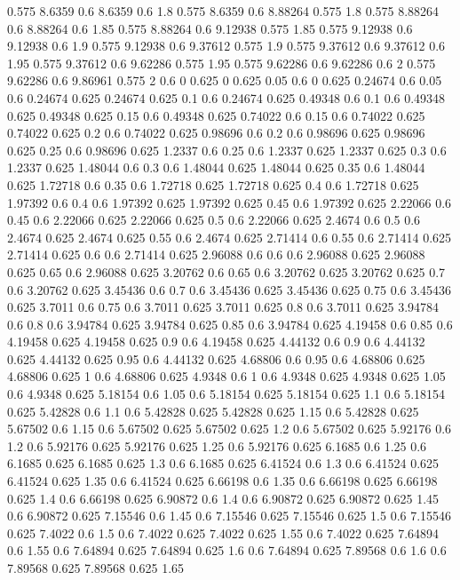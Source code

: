 0.575 8.6359
0.6 8.6359
0.6 1.8
0.575 8.6359
0.6 8.88264
0.575 1.8
0.575 8.88264
0.6 8.88264
0.6 1.85
0.575 8.88264
0.6 9.12938
0.575 1.85
0.575 9.12938
0.6 9.12938
0.6 1.9
0.575 9.12938
0.6 9.37612
0.575 1.9
0.575 9.37612
0.6 9.37612
0.6 1.95
0.575 9.37612
0.6 9.62286
0.575 1.95
0.575 9.62286
0.6 9.62286
0.6 2
0.575 9.62286
0.6 9.86961
0.575 2
0.6 0
0.625 0
0.625 0.05
0.6 0
0.625 0.24674
0.6 0.05
0.6 0.24674
0.625 0.24674
0.625 0.1
0.6 0.24674
0.625 0.49348
0.6 0.1
0.6 0.49348
0.625 0.49348
0.625 0.15
0.6 0.49348
0.625 0.74022
0.6 0.15
0.6 0.74022
0.625 0.74022
0.625 0.2
0.6 0.74022
0.625 0.98696
0.6 0.2
0.6 0.98696
0.625 0.98696
0.625 0.25
0.6 0.98696
0.625 1.2337
0.6 0.25
0.6 1.2337
0.625 1.2337
0.625 0.3
0.6 1.2337
0.625 1.48044
0.6 0.3
0.6 1.48044
0.625 1.48044
0.625 0.35
0.6 1.48044
0.625 1.72718
0.6 0.35
0.6 1.72718
0.625 1.72718
0.625 0.4
0.6 1.72718
0.625 1.97392
0.6 0.4
0.6 1.97392
0.625 1.97392
0.625 0.45
0.6 1.97392
0.625 2.22066
0.6 0.45
0.6 2.22066
0.625 2.22066
0.625 0.5
0.6 2.22066
0.625 2.4674
0.6 0.5
0.6 2.4674
0.625 2.4674
0.625 0.55
0.6 2.4674
0.625 2.71414
0.6 0.55
0.6 2.71414
0.625 2.71414
0.625 0.6
0.6 2.71414
0.625 2.96088
0.6 0.6
0.6 2.96088
0.625 2.96088
0.625 0.65
0.6 2.96088
0.625 3.20762
0.6 0.65
0.6 3.20762
0.625 3.20762
0.625 0.7
0.6 3.20762
0.625 3.45436
0.6 0.7
0.6 3.45436
0.625 3.45436
0.625 0.75
0.6 3.45436
0.625 3.7011
0.6 0.75
0.6 3.7011
0.625 3.7011
0.625 0.8
0.6 3.7011
0.625 3.94784
0.6 0.8
0.6 3.94784
0.625 3.94784
0.625 0.85
0.6 3.94784
0.625 4.19458
0.6 0.85
0.6 4.19458
0.625 4.19458
0.625 0.9
0.6 4.19458
0.625 4.44132
0.6 0.9
0.6 4.44132
0.625 4.44132
0.625 0.95
0.6 4.44132
0.625 4.68806
0.6 0.95
0.6 4.68806
0.625 4.68806
0.625 1
0.6 4.68806
0.625 4.9348
0.6 1
0.6 4.9348
0.625 4.9348
0.625 1.05
0.6 4.9348
0.625 5.18154
0.6 1.05
0.6 5.18154
0.625 5.18154
0.625 1.1
0.6 5.18154
0.625 5.42828
0.6 1.1
0.6 5.42828
0.625 5.42828
0.625 1.15
0.6 5.42828
0.625 5.67502
0.6 1.15
0.6 5.67502
0.625 5.67502
0.625 1.2
0.6 5.67502
0.625 5.92176
0.6 1.2
0.6 5.92176
0.625 5.92176
0.625 1.25
0.6 5.92176
0.625 6.1685
0.6 1.25
0.6 6.1685
0.625 6.1685
0.625 1.3
0.6 6.1685
0.625 6.41524
0.6 1.3
0.6 6.41524
0.625 6.41524
0.625 1.35
0.6 6.41524
0.625 6.66198
0.6 1.35
0.6 6.66198
0.625 6.66198
0.625 1.4
0.6 6.66198
0.625 6.90872
0.6 1.4
0.6 6.90872
0.625 6.90872
0.625 1.45
0.6 6.90872
0.625 7.15546
0.6 1.45
0.6 7.15546
0.625 7.15546
0.625 1.5
0.6 7.15546
0.625 7.4022
0.6 1.5
0.6 7.4022
0.625 7.4022
0.625 1.55
0.6 7.4022
0.625 7.64894
0.6 1.55
0.6 7.64894
0.625 7.64894
0.625 1.6
0.6 7.64894
0.625 7.89568
0.6 1.6
0.6 7.89568
0.625 7.89568
0.625 1.65
